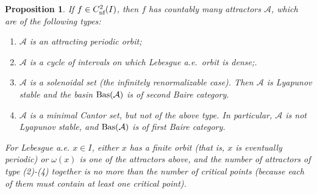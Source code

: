 \documentclass[12pt, psamsfonts, reqno]{amsart}
\newtheorem{proposition}[theorem]{Proposition}
\begin{document}
\begin{proposition}\label{propAttr}
If $f\in {C^2_{\text{\rm nf}}}(I)$, then $f$ has countably many attractors ${{\mathcal A}}$,
which are of the following types:
\begin{enumerate}
\item ${{\mathcal A}}$ is an attracting periodic orbit;
\item ${{\mathcal A}}$ is a cycle of intervals on which Lebesgue a.e.\ orbit is dense;.
\item ${{\mathcal A}}$ is a solenoidal set (the infinitely
 renormalizable case). Then ${{\mathcal A}}$ is Lyapunov stable and
 the basin ${\mathop{\rm Bas}\nolimits}({{\mathcal A}})$ is of second Baire
 category.
\item ${{\mathcal A}}$ is a minimal Cantor set, but not of the above type.
 In particular, ${{\mathcal A}}$ is not Lyapunov stable, and
 ${\mathop{\rm Bas}\nolimits}({{\mathcal A}})$ is of first Baire category.
\end{enumerate}
For Lebesgue a.e. $x \in I$, either $x$ has a finite orbit (that
is, $x$ is eventually periodic) or $\omega(x)$ is one of the
attractors above, and the number of attractors of type (2)-(4)
together is no more than the number of critical points (because
each of them must contain at least one critical point).
\end{proposition}
\end{document}
